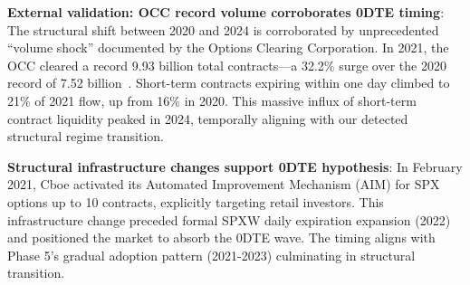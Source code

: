 \vspace{0.2cm}

\noindent\textbf{External validation: OCC record volume corroborates 0DTE timing}: The structural shift between 2020 and 2024 is corroborated by unprecedented ``volume shock'' documented by the Options Clearing Corporation. In 2021, the OCC cleared a record 9.93 billion total contracts—a 32.2\% surge over the 2020 record of 7.52 billion~\cite{occ2022record}. Short-term contracts expiring within one day climbed to 21\% of 2021 flow, up from 16\% in 2020. This massive influx of short-term contract liquidity peaked in 2024, temporally aligning with our detected structural regime transition.

\vspace{0.2cm}

\noindent\textbf{Structural infrastructure changes support 0DTE hypothesis}: In February 2021, Cboe activated its Automated Improvement Mechanism (AIM) for SPX options up to 10 contracts, explicitly targeting retail investors. This infrastructure change preceded formal SPXW daily expiration expansion (2022) and positioned the market to absorb the 0DTE wave. The timing aligns with Phase 5's gradual adoption pattern (2021-2023) culminating in structural transition.

\vspace{0.2cm}

